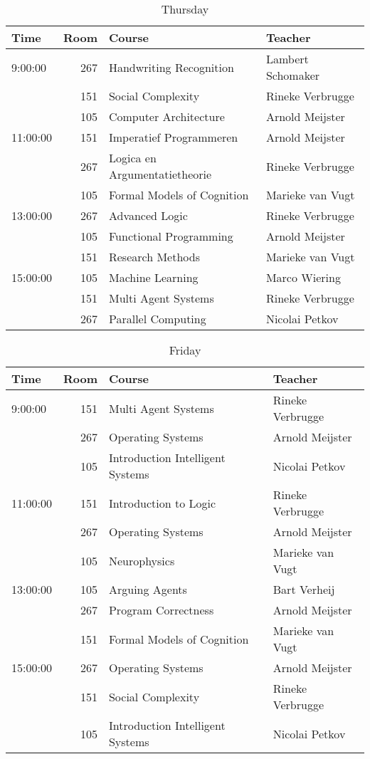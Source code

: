 \begin{table}
    \centering
    \caption{Thursday}
    \begin{tabular}{l|r|l|l}
        Time & Room & Course & Teacher \\ \hline
        \hline
        9:00:00 & 267 & Handwriting Recognition & Lambert Schomaker\\
        & 151 & Social Complexity & Rineke Verbrugge\\
        & 105 & Computer Architecture & Arnold Meijster\\\hline
        11:00:00 & 151 & Imperatief Programmeren & Arnold Meijster\\
        & 267 & Logica en Argumentatietheorie & Rineke Verbrugge\\
        & 105 & Formal Models of Cognition & Marieke van Vugt\\\hline
        13:00:00 & 267 & Advanced Logic & Rineke Verbrugge\\
        & 105 & Functional Programming & Arnold Meijster\\
        & 151 & Research Methods & Marieke van Vugt\\\hline
        15:00:00 & 105 & Machine Learning & Marco Wiering\\
        & 151 & Multi Agent Systems & Rineke Verbrugge\\
        & 267 & Parallel Computing & Nicolai Petkov\\
    \end{tabular}
\end{table}

\begin{table}
    \centering
    \caption{Friday}
    \begin{tabular}{l|r|l|l}
        Time & Room & Course & Teacher \\ \hline
        \hline
        9:00:00 & 151 & Multi Agent Systems & Rineke Verbrugge\\
        & 267 & Operating Systems & Arnold Meijster\\
        & 105 & Introduction Intelligent Systems & Nicolai Petkov\\\hline
        11:00:00 & 151 & Introduction to Logic & Rineke Verbrugge\\
        & 267 & Operating Systems & Arnold Meijster\\
        & 105 & Neurophysics & Marieke van Vugt\\\hline
        13:00:00 & 105 & Arguing Agents & Bart Verheij\\
        & 267 & Program Correctness & Arnold Meijster\\
        & 151 & Formal Models of Cognition & Marieke van Vugt\\\hline
        15:00:00 & 267 & Operating Systems & Arnold Meijster\\
        & 151 & Social Complexity & Rineke Verbrugge\\
        & 105 & Introduction Intelligent Systems & Nicolai Petkov\\
    \end{tabular}
\end{table}




